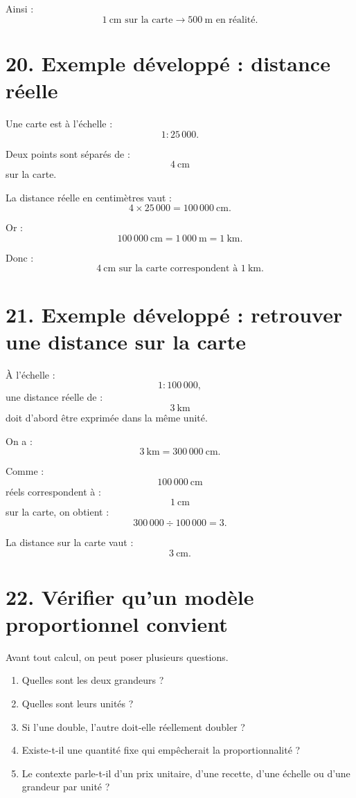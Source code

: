 Ainsi :
\[
1\ \text{cm}\text{ sur la carte}
\longrightarrow
500\ \text{m}\text{ en réalité}.
\]

\section{20. Exemple développé : distance réelle}

Une carte est à l'échelle :
\[
1:25\,000.
\]

Deux points sont séparés de :
\[
4\ \text{cm}
\]
sur la carte.

La distance réelle en centimètres vaut :
\[
4\times25\,000=100\,000\ \text{cm}.
\]

Or :
\[
100\,000\ \text{cm}=1\,000\ \text{m}=1\ \text{km}.
\]

Donc :
\[
\boxed{4\ \text{cm}\text{ sur la carte correspondent à }1\ \text{km}}.
\]

\section{21. Exemple développé : retrouver une distance sur la carte}

À l'échelle :
\[
1:100\,000,
\]
une distance réelle de :
\[
3\ \text{km}
\]
doit d'abord être exprimée dans la même unité.

On a :
\[
3\ \text{km}=300\,000\ \text{cm}.
\]

Comme :
\[
100\,000\ \text{cm}
\]
réels correspondent à :
\[
1\ \text{cm}
\]
sur la carte, on obtient :
\[
300\,000\div100\,000=3.
\]

La distance sur la carte vaut :
\[
\boxed{3\ \text{cm}}.
\]

\section{22. Vérifier qu'un modèle proportionnel convient}

Avant tout calcul, on peut poser plusieurs questions.

\begin{methode}
\begin{enumerate}
\item Quelles sont les deux grandeurs ?
\item Quelles sont leurs unités ?
\item Si l'une double, l'autre doit-elle réellement doubler ?
\item Existe-t-il une quantité fixe qui empêcherait la proportionnalité ?
\item Le contexte parle-t-il d'un prix unitaire, d'une recette, d'une échelle ou d'une grandeur par unité ?
\end{enumerate}
\end{methode}

